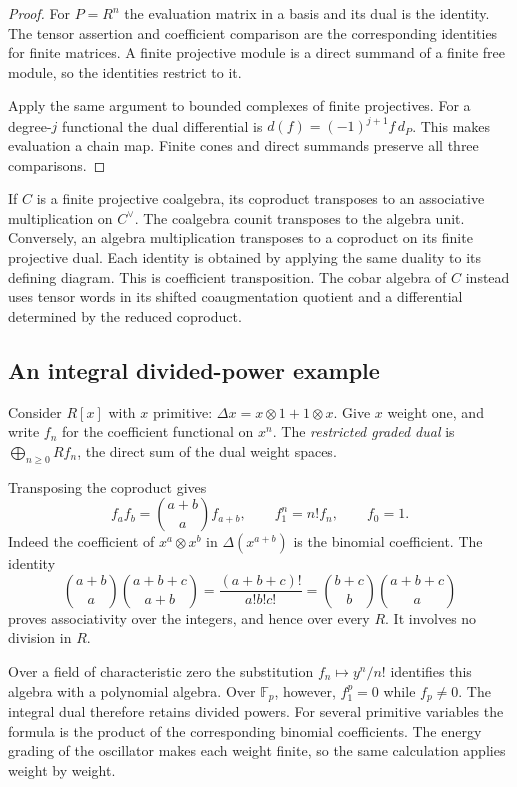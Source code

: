\begin{proof}
For $P=R^n$ the evaluation matrix in a basis and its dual is the
identity. The tensor assertion and coefficient comparison are the
corresponding identities for finite matrices. A finite projective
module is a direct summand of a finite free module, so the identities
restrict to it.

Apply the same argument to bounded complexes of finite
projectives. For a degree-$j$ functional the dual differential is
$d(f)=(-1)^{j+1}f\,d_P$. This makes evaluation a chain map.
Finite cones and direct summands preserve all three comparisons.
\end{proof}

If $C$ is a finite projective coalgebra, its coproduct transposes to
an associative multiplication on $C^\vee$. The coalgebra counit
transposes to the algebra unit. Conversely, an algebra multiplication
transposes to a coproduct on its finite projective dual. Each identity
is obtained by applying the same duality to its defining diagram.
This is coefficient transposition. The cobar algebra of $C$ instead
uses tensor words in its shifted coaugmentation quotient and a
differential determined by the reduced coproduct.

\subsection{An integral divided-power example}

Consider $R[x]$ with $x$ primitive:
$\Delta x=x\otimes1+1\otimes x$. Give $x$ weight one, and
write $f_n$ for the coefficient functional on $x^n$.
The \emph{restricted graded dual} is
$\bigoplus_{n\geq0}Rf_n$, the direct sum of the dual weight spaces.

Transposing the coproduct gives
\begin{equation}\label{v4-arith:md:eq:divided}
 f_af_b=\binom{a+b}{a}f_{a+b},\qquad
 f_1^n=n!f_n,\qquad f_0=1.
\end{equation}
Indeed the coefficient of $x^a\otimes x^b$ in
$\Delta(x^{a+b})$ is the binomial coefficient. The identity
\[
 \binom{a+b}{a}\binom{a+b+c}{a+b}
 =\frac{(a+b+c)!}{a!b!c!}
 =\binom{b+c}{b}\binom{a+b+c}{a}
\]
proves associativity over the integers, and hence over every $R$.
It involves no division in $R$.

Over a field of characteristic zero the substitution
$f_n\mapsto y^n/n!$ identifies this algebra with a polynomial
algebra. Over $\mathbb F_p$, however, $f_1^p=0$ while $f_p\ne0$.
The integral dual therefore retains divided powers. For several
primitive variables the formula is the product of the corresponding
binomial coefficients. The energy grading of the oscillator makes
each weight finite, so the same calculation applies weight by weight.

